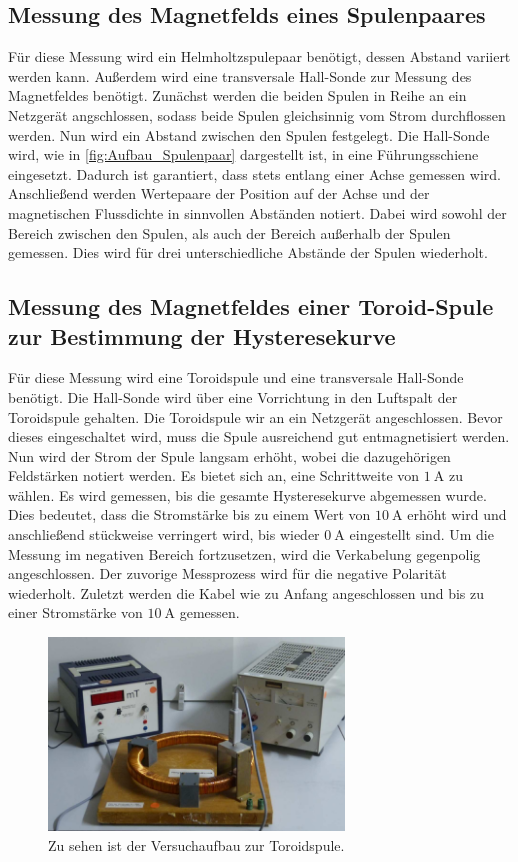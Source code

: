 \subsection{Messung des Magnetfelds eines Spulenpaares}
\label{subsec:D_Spulenpaar}
Für diese Messung wird ein Helmholtzspulepaar benötigt, dessen Abstand variiert werden kann. Außerdem wird eine transversale Hall-Sonde zur Messung des Magnetfeldes benötigt. Zunächst
werden die beiden Spulen in Reihe an ein Netzgerät angschlossen, sodass beide Spulen gleichsinnig vom Strom durchflossen werden. Nun wird ein Abstand zwischen den Spulen 
festgelegt. Die Hall-Sonde wird, wie in \autoref{fig:Aufbau_Spulenpaar} dargestellt ist, in eine Führungsschiene eingesetzt. Dadurch ist garantiert, dass stets entlang einer Achse
gemessen wird.
Anschließend werden Wertepaare der Position auf der Achse und der magnetischen Flussdichte in sinnvollen Abständen notiert. Dabei wird sowohl der Bereich zwischen den Spulen, 
als auch der Bereich außerhalb der Spulen gemessen. Dies wird für drei unterschiedliche Abstände der Spulen wiederholt.
\subsection{Messung des Magnetfeldes einer Toroid-Spule zur Bestimmung der Hysteresekurve}
\label{subsec:D_Hysterese}
Für diese Messung wird eine Toroidspule und eine transversale Hall-Sonde benötigt. Die Hall-Sonde wird über eine Vorrichtung in den Luftspalt der Toroidspule gehalten. Die Toroidspule
wir an ein Netzgerät angeschlossen. Bevor dieses eingeschaltet wird, muss die Spule ausreichend gut entmagnetisiert werden. Nun wird der Strom
der Spule langsam erhöht, wobei die dazugehörigen Feldstärken notiert werden. Es bietet sich an, eine Schrittweite von $1 \: \unit{\ampere}$ zu wählen. Es wird gemessen, bis die 
gesamte Hysteresekurve abgemessen wurde. Dies bedeutet, dass die Stromstärke bis zu einem Wert von $10 \: \unit{\ampere}$ erhöht wird und anschließend stückweise verringert wird, bis
wieder $0 \: \unit{\ampere}$ eingestellt sind.
Um die Messung im negativen Bereich fortzusetzen, wird die Verkabelung gegenpolig angeschlossen. Der zuvorige Messprozess wird für die negative Polarität wiederholt. 
Zuletzt werden die Kabel wie zu Anfang angeschlossen und bis zu einer Stromstärke von $10 \: \unit{\ampere}$ gemessen.
\begin{figure}
    \centering
    \caption{Zu sehen ist der Versuchaufbau zur Toroidspule.\cite{v308}}
    \label{fig:Aufbau_Toroid}
    \includegraphics[width=0.7\textwidth]{content/RingSpuleAufbau.PNG}
\end{figure}